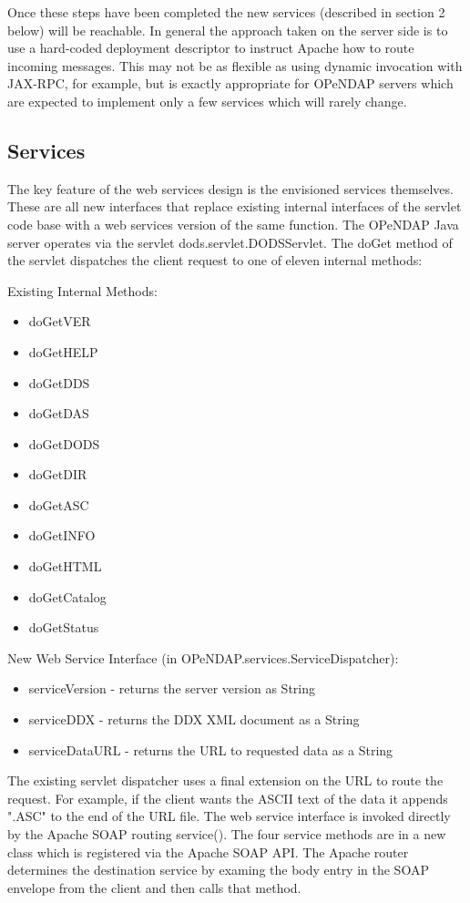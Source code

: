 \documentclass[justify]{dods-paper}
\begin{document}
Once these steps have been completed the new services (described in section 2 below) will be reachable. In general the approach taken on the server side is to use a hard-coded deployment descriptor to instruct Apache how to route incoming messages. This may not be as flexible as using dynamic invocation with JAX-RPC, for example, but is exactly appropriate for OPeNDAP servers which are expected to implement only a few services which will rarely change.


\subsection{Services}

The key feature of the web services design is the envisioned services themselves. These are all new interfaces that replace existing internal interfaces of the servlet code base with a web services version of the same function. The OPeNDAP Java server operates via the servlet dods.servlet.DODSServlet. The doGet method of the servlet dispatches the client request to one of eleven internal methods:

Existing Internal Methods:\\
\begin{itemize}
	\item doGetVER
	\item doGetHELP
	\item doGetDDS
	\item doGetDAS
	\item doGetDODS
	\item doGetDIR
	\item doGetASC
	\item doGetINFO
	\item doGetHTML
	\item doGetCatalog
	\item doGetStatus
\end{itemize}

New Web Service Interface (in OPeNDAP.services.ServiceDispatcher):
\begin{itemize}
	\item serviceVersion  - returns the server version as String
	\item serviceDDX      - returns the DDX XML document as a String
	\item serviceDataURL  - returns the URL to requested data as a String
\end{itemize}


The existing servlet dispatcher uses a final extension on the URL to route the request. For example, if the client wants the ASCII text of the data it appends ".ASC" to the end of the URL file. The web service interface is invoked directly by the Apache SOAP routing service(). The four service methods are in a new class  which is registered via the Apache SOAP API. The Apache router determines the destination service by examing the body entry in the SOAP envelope from the client and then calls that method.
\end{document}
